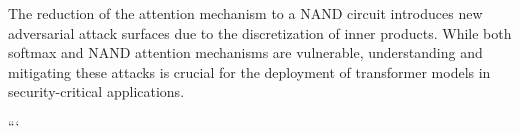 The reduction of the attention mechanism to a NAND circuit introduces new adversarial attack surfaces due to the discretization of inner products. While both softmax and NAND attention mechanisms are vulnerable, understanding and mitigating these attacks is crucial for the deployment of transformer models in security-critical applications.


































































































```